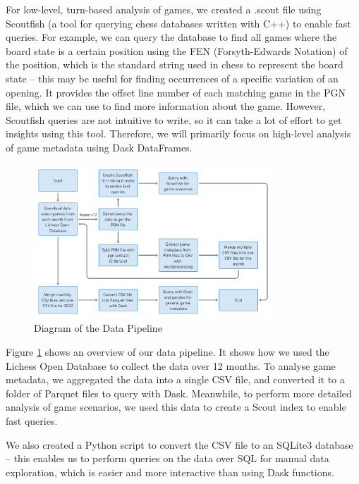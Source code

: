 \documentclass[a4paper, 11pt]{article}
\begin{document}
For low-level, turn-based analysis of games, we created a .scout file using Scoutfish (a tool for querying chess databases written with C++) \cite{scoutfish} to enable fast queries. For example, we can query the database to find all games where the board state is a certain position using the FEN (Forsyth-Edwards Notation) of the position, which is the standard string used in chess to represent the board state -- this may be useful for finding occurrences of a specific variation of an opening. It provides the offset line number of each matching game in the PGN file, which we can use to find more information about the game. However, Scoutfish queries are not intuitive to write, so it can take a lot of effort to get insights using this tool. Therefore, we will primarily focus on high-level analysis of game metadata using Dask DataFrames.

\begin{figure}[H]
    \centering
    \caption{Diagram of the Data Pipeline}
    \label{fig:dataPipeline}
    \includegraphics[width=0.8\textwidth]{Data Pipeline.png}
\end{figure}

Figure \ref{fig:dataPipeline} shows an overview of our data pipeline. It shows how we used the Lichess Open Database to collect the data over 12 months. To analyse game metadata, we aggregated the data into a single CSV file, and converted it to a folder of Parquet files to query with Dask. Meanwhile, to perform more detailed analysis of game scenarios, we used this data to create a Scout index to enable fast queries.

We also created a Python script to convert the CSV file to an SQLite3 database -- this enables us to perform queries on the data over SQL for manual data exploration, which is easier and more interactive than using Dask functions.
\end{document}
